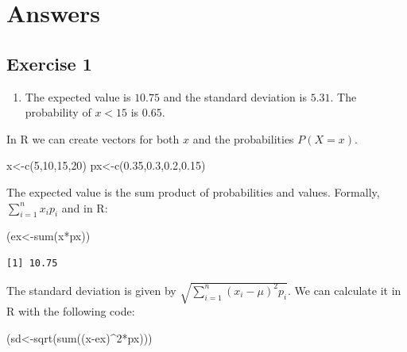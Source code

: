 \documentclass[
  letterpaper,
  DIV=11,
  numbers=noendperiod]{scrreprt}
\newenvironment{Shaded}{\begin{snugshade}}{\end{snugshade}}
\newcommand{\DecValTok}[1]{\textcolor[rgb]{0.68,0.00,0.00}{#1}}
\newcommand{\FloatTok}[1]{\textcolor[rgb]{0.68,0.00,0.00}{#1}}
\newcommand{\FunctionTok}[1]{\textcolor[rgb]{0.28,0.35,0.67}{#1}}
\newcommand{\NormalTok}[1]{\textcolor[rgb]{0.00,0.23,0.31}{#1}}
\newcommand{\OtherTok}[1]{\textcolor[rgb]{0.00,0.23,0.31}{#1}}
\newcommand{\SpecialCharTok}[1]{\textcolor[rgb]{0.37,0.37,0.37}{#1}}
\providecommand{\tightlist}{%
  \setlength{\itemsep}{0pt}\setlength{\parskip}{0pt}}\usepackage{longtable,booktabs,array}
\begin{document}
\hypertarget{answers-8}{%
\section{Answers}\label{answers-8}}

\hypertarget{exercise-1-17}{%
\subsection*{Exercise 1}\label{exercise-1-17}}

\begin{enumerate}
\def\labelenumi{\arabic{enumi}.}
\tightlist
\item
  The expected value is \(10.75\) and the standard deviation is
  \(5.31\). The probability of \(x<15\) is \(0.65\).
\end{enumerate}

In R we can create vectors for both \(x\) and the probabilities
\(P(X=x)\).

\begin{Shaded}
\begin{Highlighting}[numbers=left,,]
\NormalTok{x}\OtherTok{\textless{}{-}}\FunctionTok{c}\NormalTok{(}\DecValTok{5}\NormalTok{,}\DecValTok{10}\NormalTok{,}\DecValTok{15}\NormalTok{,}\DecValTok{20}\NormalTok{)}
\NormalTok{px}\OtherTok{\textless{}{-}}\FunctionTok{c}\NormalTok{(}\FloatTok{0.35}\NormalTok{,}\FloatTok{0.3}\NormalTok{,}\FloatTok{0.2}\NormalTok{,}\FloatTok{0.15}\NormalTok{)}
\end{Highlighting}
\end{Shaded}

The expected value is the sum product of probabilities and values.
Formally, \(\sum_{i=1}^{n}x_{i}p_{i}\) and in R:

\begin{Shaded}
\begin{Highlighting}[numbers=left,,]
\NormalTok{(ex}\OtherTok{\textless{}{-}}\FunctionTok{sum}\NormalTok{(x}\SpecialCharTok{*}\NormalTok{px))}
\end{Highlighting}
\end{Shaded}

\begin{verbatim}
[1] 10.75
\end{verbatim}

The standard deviation is given by
\(\sqrt{\sum_{i=1}^{n}(x_{i}-\mu)^2p_{i}}\). We can calculate it in R
with the following code:

\begin{Shaded}
\begin{Highlighting}[numbers=left,,]
\NormalTok{(sd}\OtherTok{\textless{}{-}}\FunctionTok{sqrt}\NormalTok{(}\FunctionTok{sum}\NormalTok{((x}\SpecialCharTok{{-}}\NormalTok{ex)}\SpecialCharTok{\^{}}\DecValTok{2}\SpecialCharTok{*}\NormalTok{px)))}
\end{Highlighting}
\end{Shaded}
\end{document}
